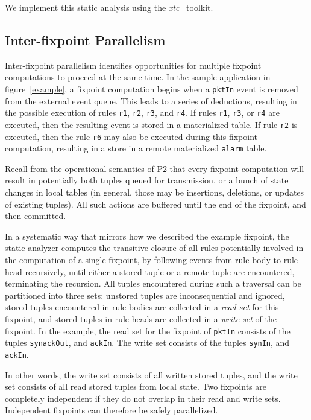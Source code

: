 \documentclass[10pt,twocolumn]{MyTightStyle}
\newcommand{\ol}[1]{{\tt\footnotesize#1}}
\begin{document}
We implement this static
analysis using the {\em xtc}~\cite{grimm06,hirzel07} toolkit.


\subsection{Inter-fixpoint Parallelism}

Inter-fixpoint parallelism identifies opportunities for multiple
fixpoint computations to proceed at the same time. In the sample
application in figure~\ref{example}, a fixpoint computation begins when
a \ol{pktIn} event is removed from the external event queue. This leads to a
series of deductions, resulting in the possible execution of rules \ol{r1}, 
\ol{r2}, \ol{r3}, and \ol{r4}. If rules \ol{r1}, \ol{r3}, or
\ol{r4} are executed, then the resulting event is stored in a
materialized table. If rule \ol{r2} is executed, then the rule \ol{r6}
may also be executed during this fixpoint computation, resulting in a
store in a remote materialized \ol{alarm} table. 

Recall from the operational semantics of P2 that every fixpoint
computation will result in potentially both tuples queued for
transmission, or a bunch of state changes in local tables (in general,
those may be insertions, deletions, or updates of existing tuples). All such actions are buffered until the end of the fixpoint, and then committed. 

In a systematic way that mirrors how we described the example fixpoint,
the static analyzer computes the transitive closure of all rules
potentially involved in the computation of a single fixpoint, by
following events from rule body to rule head recursively, until either a
stored tuple or a remote tuple are encountered, terminating the
recursion. All tuples encountered during such a traversal can be
partitioned into three sets: unstored tuples are inconsequential and
ignored, stored tuples encountered in rule bodies are
collected in a {\em read set} for this fixpoint, and stored tuples in
rule heads are collected in a {\em write set} of the fixpoint. In the
example, the read set for the fixpoint of \ol{pktIn} consists of the
tuples \ol{synackOut}, and \ol{ackIn}. The write set consists of the
tuples \ol{synIn}, and \ol{ackIn}.

In other words, the write set consists of all written stored tuples, and the
write set consists of all read stored tuples from local state. Two fixpoints are completely
independent if they do not overlap in their read and write
sets. Independent fixpoints can
therefore be safely parallelized. 
\end{document}
